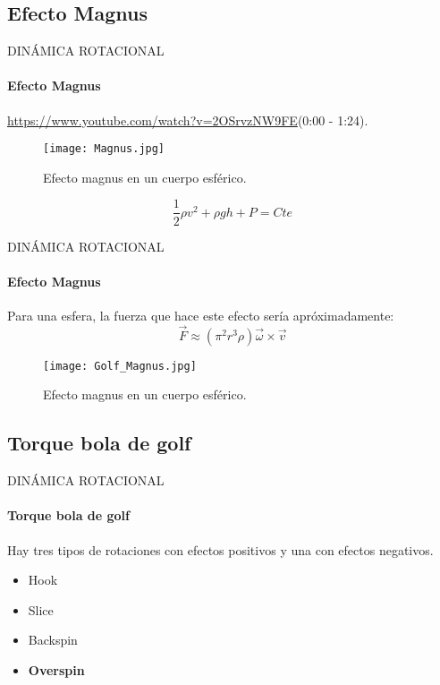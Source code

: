 \subsection{Efecto Magnus}
\begin{frame}{DINÁMICA ROTACIONAL}
\framesubtitle{Efecto Magnus}
\url{https://www.youtube.com/watch?v=2OSrvzNW9FE}\quad(0:00 - 1:24).
\begin{figure}[H]
      \centering
      \texttt{[image: Magnus.jpg]}
      \caption{Efecto magnus en un cuerpo esférico.}
\end{figure}
\begin{equation}
\frac { 1 }{ 2 } \rho { v }^{ 2 }+\rho gh+P=Cte
\end{equation}
\end{frame}
\begin{frame}{DINÁMICA ROTACIONAL}
\framesubtitle{Efecto Magnus}
Para una esfera, la fuerza que hace este efecto sería apróximadamente:
\begin{equation}
\vec { F } \approx \left( { \pi  }^{ 2 }{ r }^{ 3 }\rho  \right) \vec { \omega  } \times \vec { v } 
\end{equation}
\begin{figure}[H]
      \centering
      \texttt{[image: Golf\_Magnus.jpg]}
      \caption{Efecto magnus en un cuerpo esférico.}
\end{figure}
\end{frame}
\subsection{Torque bola de golf}
\begin{frame}{DINÁMICA ROTACIONAL}
\framesubtitle{Torque bola de golf}
Hay tres tipos de rotaciones con efectos positivos y una con efectos negativos.
\begin{itemize}
	\item Hook
	\item Slice
	\item Backspin
	\item \textbf{Overspin}
\end{itemize}
\end{frame}